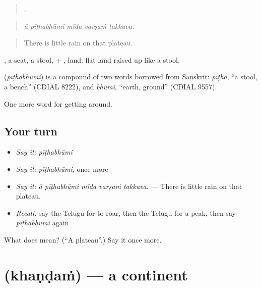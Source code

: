 \begin{quote}
    .
\end{quote}

\begin{quote}
\emph{ā pīṭhabhūmi mīda varṣaṁ takkuva.}
\end{quote}

\begin{quote}
There is little rain on that plateau.
\end{quote}

, a seat, a stool, + , land: flat land raised up like a stool.

\begin{cousinweb}
\textbf{} (\emph{pīṭhabhūmi}) is a compound of two words borrowed from Sanskrit: \emph{pīṭha}, \textquotedblleft{}a stool, a bench\textquotedblright{} (CDIAL 8222), and \emph{bhūmi}, \textquotedblleft{}earth, ground\textquotedblright{} (CDIAL 9557).
\end{cousinweb}

\begin{grammarlens}[title={What you've built}]
One more word for getting around.
\end{grammarlens}

\subsection*{Your turn}
\begin{itemize}
\raggedright
  \item \emph{Say it:} \emph{pīṭhabhūmi}
  \item \emph{Say it:} \emph{pīṭhabhūmi}, once more
  \item \emph{Say it:} \emph{ā pīṭhabhūmi mīda varṣaṁ takkuva.} — There is little rain on that plateau.
  \item \emph{Recall:} say the Telugu for to roar, then the Telugu for a peak, then say \emph{pīṭhabhūmi} again
\end{itemize}

\begin{tcolorbox}[breakable,colback=teal!4,colframe=teal!35!black,title={Before you move on}]
What does  mean? (\textquotedblleft{}A plateau\textquotedblright{}.) Say it once more.
\end{tcolorbox}
\section[\texorpdfstring{\te{ఖండం} (khaṇḍaṁ)}{ఖండం (khaṇḍaṁ)}]{ (khaṇḍaṁ) — a continent}

